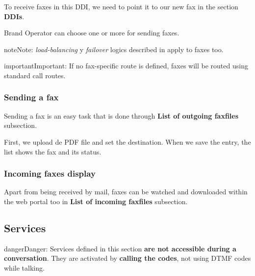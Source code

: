 \documentclass[letterpaper,10pt,english]{sphinxmanual}
\begin{document}
To receive faxes in this DDI, we need to point it to our new fax in the section
\textbf{DDIs}.

Brand Operator can choose one or more {\hyperref[administration_portal/brand/routing/outgoing_routings:outgoing\string-routings]{}} for sending faxes.

\begin{notice}{note}{Note:}
\emph{load-balancing} y \emph{failover} logics described in {\hyperref[administration_portal/brand/routing/outgoing_routings:outgoing\string-routings]{}}
apply to faxes too.
\end{notice}

\begin{notice}{important}{Important:}
If no fax-specific route is defined, faxes will be routed using
standard call routes.
\end{notice}


\subsubsection{Sending a fax}
\label{administration_portal/client/vpbx/faxes:sending-a-fax}
Sending a fax is an easy task that is done through \textbf{List of outgoing faxfiles} subsection.

First, we upload de PDF file and set the destination. When we save the entry, the list shows the fax and its status.


\subsubsection{Incoming faxes display}
\label{administration_portal/client/vpbx/faxes:incoming-faxes-display}
Apart from being received by mail, faxes can be watched and downloaded within
the web portal too in \textbf{List of incoming faxfiles} subsection.


\subsection{Services}
\label{administration_portal/client/vpbx/services:services}\label{administration_portal/client/vpbx/services:client-services}\label{administration_portal/client/vpbx/services::doc}
\begin{notice}{danger}{Danger:}
Services defined in this section \textbf{are not accessible during a
conversation}. They are activated by \textbf{calling the codes}, not using
DTMF codes while talking.
\end{notice}
\end{document}
